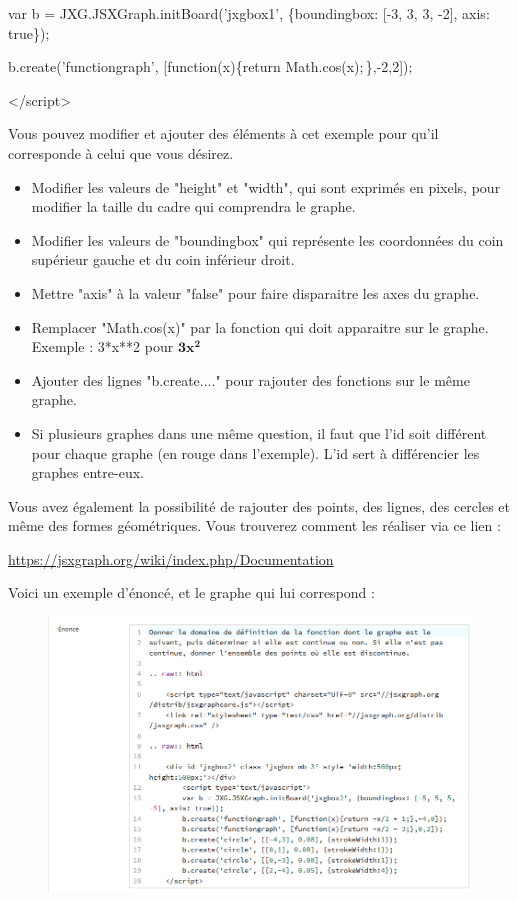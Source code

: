 \documentclass{article}
\begin{document}
\hspace{2cm}var b = JXG.JSXGraph.initBoard({\color{red}'jxgbox1'}, \{boundingbox: [-3, 3, 3, -2], axis: true\})${;}$

\hspace{2cm}b.create('functiongraph', [function(x)\{return Math.cos(x)${;}$\},-2,2])${;}$

\hspace{1cm}</script>
\bigskip

Vous pouvez modifier et ajouter des éléments à cet exemple pour qu'il corresponde à celui que vous désirez.

\begin{itemize}
    \item Modifier les valeurs de "height" et "width", qui sont exprimés en pixels, pour modifier la taille du cadre qui comprendra le graphe.
    \item Modifier les valeurs de "boundingbox" qui représente les coordonnées du coin supérieur gauche et du coin inférieur droit.
    \item Mettre "axis" à la valeur "false" pour faire disparaitre les axes du graphe.
    \item Remplacer "Math.cos(x)" par la fonction qui doit apparaitre sur le graphe. Exemple : 3*x**2 pour $\mathbf{3x^2}$
    \item Ajouter des lignes "b.create...." pour rajouter des fonctions sur le même graphe.
    \item Si plusieurs graphes dans une même question, il faut que l'id soit différent pour chaque graphe (en rouge dans l'exemple). L'id sert à différencier les graphes entre-eux.
\end{itemize}
\bigskip

Vous avez également la possibilité de rajouter des points, des lignes, des cercles et même des formes géométriques. Vous trouverez comment les réaliser via ce lien :
\bigskip

\url{https://jsxgraph.org/wiki/index.php/Documentation}

\bigskip

Voici un exemple d'énoncé, et le graphe qui lui correspond :

\begin{figure}[!htb]
    \centering
    \includegraphics[scale=0.6]{images/fonc.png}
\end{figure}
\end{document}
